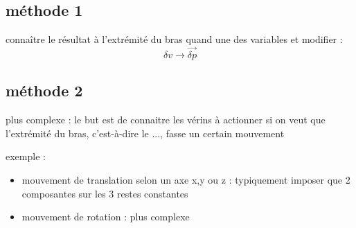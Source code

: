 \documentclass[12pt,a4paper]{article}
\begin{document}
\subsection{méthode 1}
connaître le résultat à l'extrémité du bras quand une des variables et modifier : 
\begin{equation}
\delta v \rightarrow \vec{\delta p}
\end{equation}

\subsection{méthode 2}
plus complexe : 
le but est de connaitre les vérins à actionner si on veut que l'extrémité du bras, c'est-à-dire le ..., fasse un certain mouvement

exemple : 
\begin{itemize}
	\item mouvement de translation selon un axe x,y ou z : typiquement imposer que 2 composantes sur les 3 restes constantes
	\item mouvement de rotation : plus complexe
\end{itemize}



\newpage

\end{document}
